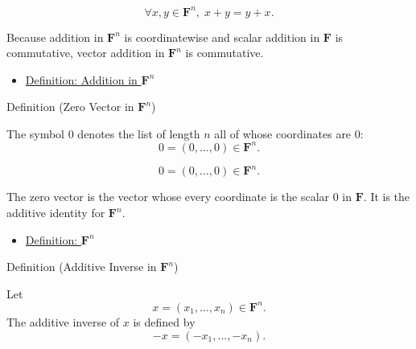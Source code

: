 \begin{remark*}
\[
\forall x,y \in \mathbf{F}^n,\; x+y=y+x.
\]
\end{remark*}

\begin{remark*}[Interpretation]
Because addition in $\mathbf{F}^n$ is coordinatewise and scalar addition in
$\mathbf{F}$ is commutative, vector addition in $\mathbf{F}^n$ is commutative.
\end{remark*}

\begin{remark*}[Dependencies]
\begin{itemize}
  \item \hyperref[def:addition-in-Fn]{Definition: Addition in $\mathbf{F}^n$}
\end{itemize}
\end{remark*}


\begin{definitionbox}{Definition (Zero Vector in $\mathbf{F}^n$)}
\begin{definition}
\label{def:zero-vector-in-Fn}
The symbol $0$ denotes the list of length $n$ all of whose coordinates are $0$:
\[
0=(0,\dots,0)\in \mathbf{F}^n.
\]
\end{definition}
\end{definitionbox}

\begin{remark*}
\[
0=(0,\dots,0)\in \mathbf{F}^n.
\]
\end{remark*}

\begin{remark*}[Interpretation]
The zero vector is the vector whose every coordinate is the scalar $0$ in
$\mathbf{F}$. It is the additive identity for $\mathbf{F}^n$.
\end{remark*}

\begin{remark*}[Dependencies]
\begin{itemize}
  \item \hyperref[def:Fn]{Definition: $\mathbf{F}^n$}
\end{itemize}
\end{remark*}


\begin{definitionbox}{Definition (Additive Inverse in $\mathbf{F}^n$)}
\begin{definition}
\label{def:additive-inverse-in-Fn}
Let
\[
x=(x_1,\dots,x_n)\in \mathbf{F}^n.
\]
The additive inverse of $x$ is defined by
\[
-x=(-x_1,\dots,-x_n).
\]
\end{definition}
\end{definitionbox}

